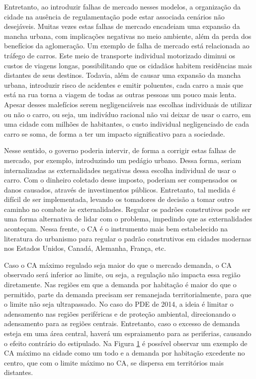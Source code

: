 Entretanto, ao introduzir falhas de mercado nesses modelos, a organização da cidade na ausência de regulamentação pode estar associada cenários não desejáveis. Muitas vezes estas falhas de mercado encadeiam uma expansão da mancha urbana, com implicações negativas no meio ambiente, além da perda dos benefícios da aglomeração. Um exemplo de falha de mercado está relacionada ao tráfego de carros. Este meio de transporte individual motorizado diminui os custos de viagens longas, possibilitando que os cidadãos habitem residências mais distantes de seus destinos. Todavia, além de causar uma expansão da mancha urbana, introduzir risco de acidentes e emitir poluentes, cada carro a mais que está na rua torna a viagem de todas as outras pessoas um pouco mais lenta. Apesar desses malefícios serem negligenciáveis nas escolhas individuais de utilizar ou não o carro, ou seja, um indivíduo racional não vai deixar de usar o carro, em uma cidade com milhões de habitantes, o custo individual negligenciado de cada carro se soma, de forma a ter um impacto significativo para a sociedade.

Nesse sentido, o governo poderia intervir, de forma a corrigir estas falhas de mercado, por exemplo, introduzindo um pedágio urbano. Dessa forma, seriam internalizadas as externalidades negativas dessa escolha individual de usar o carro. Com o dinheiro coletado desse imposto, poderiam ser compensados os danos causados, através de investimentos públicos. Entretanto, tal medida é difícil de ser implementada, levando os tomadores de decisão a tomar outro caminho no combate às externalidades. Regular os padrões construtivos pode ser uma forma alternativa de lidar com o problema, impedindo que as externalidades aconteçam. Nessa frente, o CA é o instrumento mais bem estabelecido na literatura do urbanismo para regular o padrão construtivos em cidades modernas nos Estados Unidos, Canadá, Alemanha, França, etc.

\begin{figure}[h]
    \caption{Impacto da regulação no CA da cidade}
    \centering
    \begin{subfigure}{.6\linewidth}
        
    \end{subfigure}
    \label{fig:FAR}
\end{figure}

Caso o CA máximo regulado seja maior do que o mercado demanda, o CA observado será inferior ao limite, ou seja, a regulação não impacta essa região diretamente. Nas regiões em que a demanda por habitação é maior do que o permitido, parte da demanda precisam ser remanejada territorialmente, para que o limite não seja ultrapassado. No caso do PDE de 2014, a ideia é limitar o adensamento nas regiões periféricas e de proteção ambiental, direcionando o adensamento para as regiões centrais. Entretanto, caso o excesso de demanda esteja em uma área central, haverá um espraiamento para as periferias, causando o efeito contrário do estipulado. Na Figura \ref{fig:FAR} é possível observar um exemplo de CA máximo na cidade como um todo e a demanda por habitação excedente no centro, que com o limite máximo no CA, se dispersa em territórios mais distantes.


